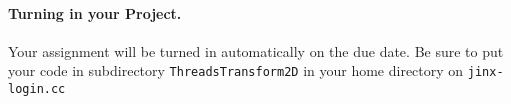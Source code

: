 \documentclass[10pt]{article}
\begin{document}
\paragraph{Turning in your Project.}
Your assignment will be turned in automatically on the due date.
Be sure to put your code in subdirectory {\tt ThreadsTransform2D}
in your home directory on {\tt jinx-login.cc}
\end{document}
